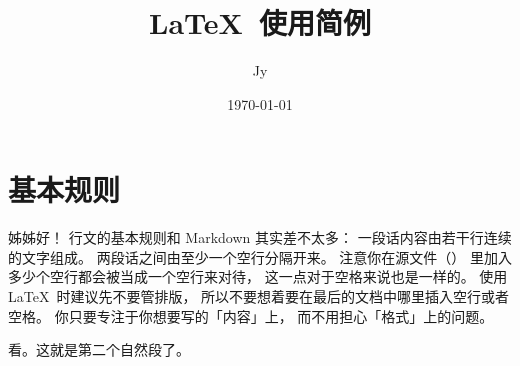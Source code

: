 \documentclass{article}
\title{\LaTeX\ 使用简例}
\author{Jy}
\date{\today}
\begin{document}
\maketitle %

\section{基本规则}

姊姊好！
行文的基本规则和 Markdown 其实差不太多：
一段话内容由若干行连续的文字组成。
两段话之间由至少一个空行分隔开来。
注意你在源文件（）
里加入多少个空行都会被当成一个空行来对待，
这一点对于空格来说也是一样的。
使用 \LaTeX\ 时建议先不要管排版，
所以不要想着要在最后的文档中哪里插入空行或者空格。
你只要专注于你想要写的「内容」上，
而不用担心「格式」上的问题。

看。这就是第二个自然段了。
\end{document}
